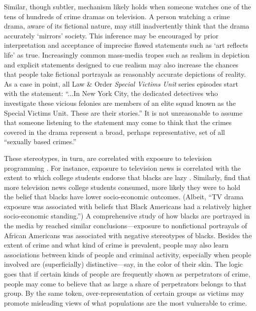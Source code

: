 \documentclass[12pt, letterpaper]{article}
\begin{document}
Similar, though subtler, mechanism likely holds when someone watches one of the tens of hundreds of crime dramas on television. A person watching a crime drama, aware of its fictional nature, may still inadvertently think that the drama accurately `mirrors' society. This inference may be encouraged by prior interpretation and acceptance of imprecise flawed statements such as `art reflects life' as true. Increasingly common mass-media tropes such as realism in depiction and explicit statements designed to cue realism may also increase the chances that people take fictional portrayals as reasonably accurate depictions of reality. As a case in point, all Law \& Order \textit{Special Victims Unit} series episodes start with the statement: ``...In New York City, the dedicated detectives who investigate these vicious felonies are members of an elite squad known as the Special Victims Unit. These are their stories.'' It is not unreasonable to assume that someone listening to the statement may come to think that the crimes covered in the drama represent a broad, perhaps representative, set of all ``sexually based crimes.''

These stereotypes, in turn, are correlated with exposure to television programming \citep{busselle2002television, entman2001black, armstrong1992tv}. For instance, exposure to television news is correlated with the extent to which college students endorse that blacks are lazy \citep{busselle2002television}. Similarly, \citet{armstrong1992tv} find that more television news college students consumed, more likely they were to hold the belief that blacks have lower socio-economic outcomes. (Albeit, ``TV drama exposure was associated with beliefs that Black Americans had a relatively higher socio-economic standing.'') A comprehensive study of how blacks are portrayed in the media by \citet{entman2001black} reached similar conclusions---exposure to nonfictional portrayals of African Americans was associated with negative stereotypes of blacks.
Besides the extent of crime and what kind of crime is prevalent, people may also learn associations between kinds of people and criminal activity, especially when people involved are (superficially) distinctive---say, in the color of their skin. The logic goes that if certain kinds of people are frequently shown as perpetrators of crime, people may come to believe that as large a share of perpetrators belongs to that group. By the same token, over-representation of certain groups as victims may promote misleading views of what populations are the most vulnerable to crime.
\end{document}
